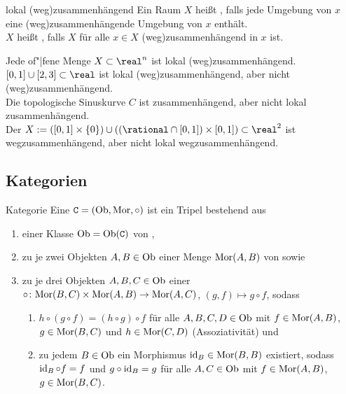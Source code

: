 \begin{Def}{lokal (weg)zusammenhängend}
    Ein Raum $X$ heißt , falls
    jede Umgebung von $x$ eine (weg)zusammenhängende Umgebung von $x$
    enthält. \\
    $X$ heißt , falls $X$ für alle
    $x \in X$ (weg)zusammenhängend in $x$ ist.
\end{Def}

\begin{Bsp}
    Jede of"|fene Menge $X \subset \real^n$ ist lokal (weg)zusammenhängend. \\
    $[0, 1] \cup [2, 3] \subset \real$ ist lokal (weg)zusammenhängend,
    aber nicht (weg)zusammenhängend. \\
    Die topologische Sinuskurve $C$ ist zusammenhängend,
    aber nicht lokal zusammenhängend. \\
    Der  $X := ([0, 1] \times \{0\}) \cup
    ((\rational \cap [0, 1]) \times [0, 1]) \subset \real^2$
    ist wegzusammenhängend, aber nicht lokal wegzusammenhängend.
\end{Bsp}

\pagebreak

\subsection{%
    Kategorien%
}

\begin{Def}{Kategorie}
    Eine  $\mathtt{C} = (\text{Ob}, \text{Mor}, \circ)$ ist ein Tripel
    bestehend aus
    \begin{enumerate}
        \item
        einer Klasse $\text{Ob} = \text{Ob}(\mathtt{C})$ von ,

        \item
        zu je zwei Objekten $A, B \in \text{Ob}$ einer Menge $\text{Mor}(A, B)$ von
         sowie

        \item
        zu je drei Objekten $A, B, C \in \text{Ob}$ einer  \\
        $\circ\colon \text{Mor}(B, C) \times \text{Mor}(A, B) \rightarrow \text{Mor}(A, C)$,
        $(g, f) \mapsto g \circ f$, sodass
        \begin{enumerate}
            \item
            $h \circ (g \circ f) = (h \circ g) \circ f$
            für alle $A, B, C, D \in \text{Ob}$ mit $f \in \text{Mor}(A, B)$,
            $g \in \text{Mor}(B, C)$ und $h \in \text{Mor}(C, D)$ (Assoziativität) und

            \item
            zu jedem $B \in \text{Ob}$ ein Morphismus $\operatorname{id}_B \in \text{Mor}(B, B)$
            existiert, sodass $\operatorname{id}_B \circ f = f$ und $g \circ \operatorname{id}_B = g$
            für alle $A, C \in \text{Ob}$ mit
            $f \in \text{Mor}(A, B)$, $g \in \text{Mor}(B, C)$.
        \end{enumerate}
    \end{enumerate}
\end{Def}

